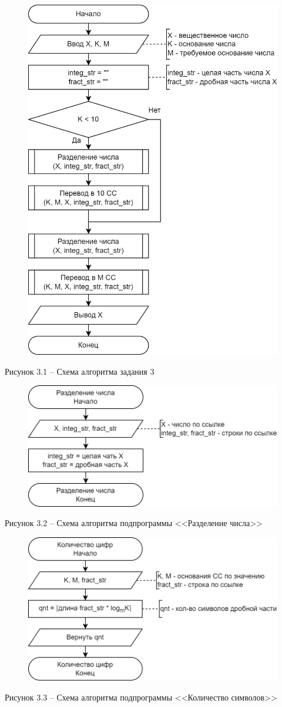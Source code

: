 \documentclass[a4paper,14pt]{extarticle}
\begin{document}
	\begin{figure}[h]
		\centering
		\includegraphics[width=0.6\linewidth]{schemes/s-3-1}
	\end{figure}
	\begin{center}
		Рисунок 3.1 – Схема алгоритма задания 3
	\end{center}
	\pagebreak
	
	\begin{figure}[h]
		\centering
		\includegraphics[width=0.6\linewidth]{schemes/s-3-2}
	\end{figure}
	\begin{center}
		Рисунок 3.2 – Схема алгоритма подпрограммы <<Разделение числа>>
	\end{center}
	
	\begin{figure}[h]
		\centering
		\includegraphics[width=0.6\linewidth]{schemes/s-3-3}
	\end{figure}
	\begin{center}
		Рисунок 3.3 – Схема алгоритма подпрограммы <<Количество символов>>
	\end{center}
	\pagebreak
	
\end{document}
